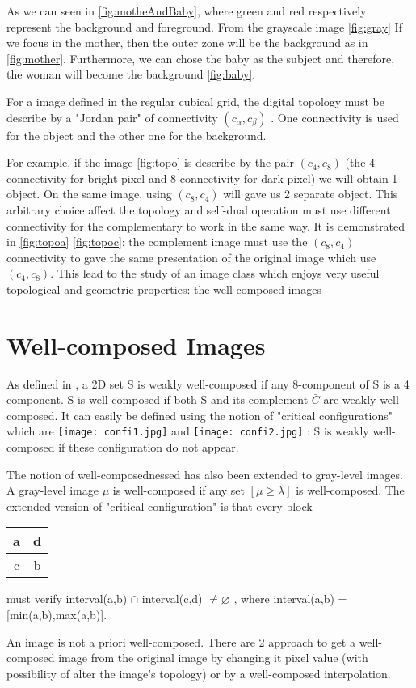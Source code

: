 \par
As we can seen in \ref{fig:motheAndBaby}, where green and red respectively represent the background and foreground. From the grayscale image \ref{fig:gray} If we focus in the mother, then the outer zone will be the background as in \ref{fig:mother}. Furthermore, we can chose the baby as the subject and therefore, the woman will become the background \ref{fig:baby}.	
\par
For a image defined in the regular cubical grid, the digital topology must be describe by a "Jordan pair" of connectivity $(c_\alpha,c_\beta)$ \cite{Kong:1989:DTI:71397.71400}. One connectivity is used for the object and the other one for the background. 
\par 
For example, if the image \ref{fig:topo} is describe by the pair $(c_4,c_8)$ (the 4-connectivity for bright pixel and 8-connectivity for dark pixel) we will obtain 1 object. On the same image, using $(c_8,c_4)$ will gave us 2 separate object. This arbitrary choice affect the topology and self-dual operation must use different connectivity for the complementary to work in the same way. It is demonstrated in \ref{fig:topoa} \ref{fig:topoc}: the complement image must use the $(c_8,c_4)$ connectivity to gave the same presentation of the original image which use $(c_4,c_8)$. This lead to the study of an image class which enjoys very useful topological and geometric properties: the well-composed images

\section{Well-composed Images}
\par
As defined in \cite{Latecki95}, a 2D set S is weakly well-composed if any 8-component of S is a 4 component. S is well-composed if both S and its complement $\bar{C}$ are weakly well-composed. It can easily be defined using the notion of "critical configurations" which are \texttt{[image: confi1.jpg]} and \texttt{[image: confi2.jpg]} : S is weakly well-composed if these configuration do not appear.
\par
The notion of well-composednessed has also been extended to gray-level images. A gray-level image $\mu$ is well-composed if any set $[\mu \geq \lambda ]$ is well-composed. The extended version of "critical configuration" is that every block 
\begin{tabular}{|c|c|}
\hline 
a & d \\ 
\hline 
c & b \\ 
\hline 
\end{tabular} 
must verify interval(a,b) $\cap$ interval(c,d) $\neq \varnothing$ , where interval(a,b) = [min(a,b),max(a,b)].
\par
An image is not a priori well-composed. There are 2 approach to get a well-composed image from the original image \cite{geraud.15.ismm} by changing it pixel value (with possibility of alter the image's topology) or by a well-composed interpolation.


